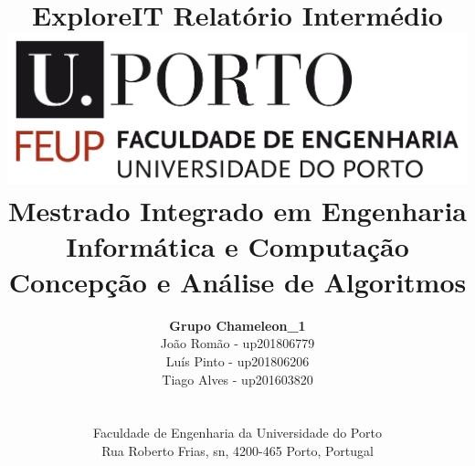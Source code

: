 \documentclass[a4paper]{article}
\begin{document}
\setlength{\textwidth}{16cm}
\setlength{\textheight}{22cm}

\title{\Huge\textbf{ExploreIT}\linebreak\linebreak\linebreak
\Large\textbf{Relatório Intermédio}\linebreak\linebreak
\linebreak\linebreak
\includegraphics[scale=0.1]{images/feup-logo.png}\linebreak\linebreak
\linebreak\linebreak
\Large{Mestrado Integrado em Engenharia Informática e Computação} \linebreak\linebreak
\Large{Concepção e Análise de Algoritmos}\linebreak
}

\author{\textbf{Grupo Chameleon\_1}\\ João Romão - up201806779 \\ Luís Pinto - up201806206 \\ Tiago  Alves - up201603820 \\\linebreak\linebreak \\
 \\ Faculdade de Engenharia da Universidade do Porto \\ Rua Roberto Frias, s\/n, 4200-465 Porto, Portugal \linebreak\linebreak\linebreak
\linebreak\linebreak\vspace{1cm}}
\maketitle
\thispagestyle{empty}
\end{document}
